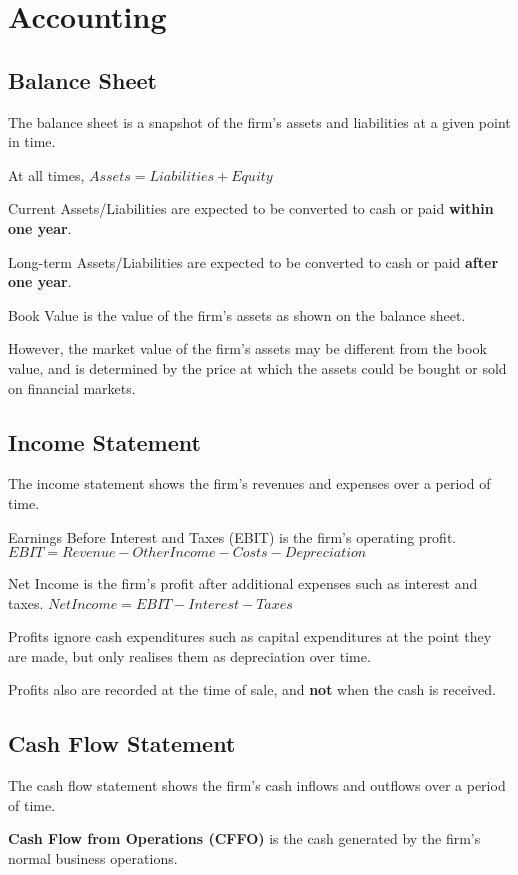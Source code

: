 \section{Accounting}
\subsection{Balance Sheet}
The balance sheet is a snapshot of the firm's assets and liabilities at a given point in time.

At all times, $Assets = Liabilities + Equity$

Current Assets/Liabilities are expected to be converted to cash or paid \textbf{within one year}.

Long-term Assets/Liabilities are expected to be converted to cash or paid \textbf{after one year}.

Book Value is the value of the firm's assets as shown on the balance sheet.

However, the market value of the firm's assets may be different from the book value, and is determined
by the price at which the assets could be bought or sold on financial markets.

\subsection{Income Statement}
The income statement shows the firm's revenues and expenses over a period of time.

Earnings Before Interest and Taxes (EBIT) is the firm's operating profit.
$EBIT = Revenue - Other Income - Costs - Depreciation$

Net Income is the firm's profit after additional expenses such as interest and taxes.
$Net Income = EBIT - Interest - Taxes$

Profits ignore cash expenditures such as capital expenditures at the point they are made, but only realises them 
as depreciation over time.

Profits also are recorded at the time of sale, and \textbf{not} when the cash is received.

\subsection{Cash Flow Statement}
The cash flow statement shows the firm's cash inflows and outflows over a period of time.

\textbf{Cash Flow from Operations (CFFO)} is the cash generated by the firm's normal business operations.

